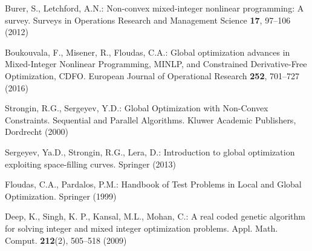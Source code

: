\documentclass{llncs}
\begin{document}
\begin{thebibliography}{10}

Burer, S., Letchford, A.N.: Non-convex mixed-integer nonlinear programming: A survey. Surveys in Operations Research and Management Science \textbf{17}, 97--106 (2012) 

Boukouvala, F., Misener, R., Floudas, C.A.: Global optimization advances in Mixed-Integer Nonlinear Programming, MINLP, and Constrained Derivative-Free Optimization, CDFO. European Journal of Operational Research \textbf{252}, 701--727 (2016) 

Strongin, R.G., Sergeyev, Y.D.: Global Optimization with Non-Convex Constraints. Sequential and Parallel Algorithms. Kluwer Academic Publishers, Dordrecht (2000) %

Sergeyev, Ya.D., Strongin, R.G., Lera, D.: Introduction to global optimization exploiting space-filling curves. Springer (2013) %

Floudas, C.A., Pardalos, P.M.:  Handbook of Test Problems in Local and Global Optimization. Springer (1999)  %

Deep, K., Singh, K. P., Kansal, M.L., Mohan, C.: A real coded genetic algorithm for solving integer and mixed integer optimization problems. Appl. Math. Comput. \textbf{212}(2), 505--518 (2009)


\end{thebibliography}
\end{document}
